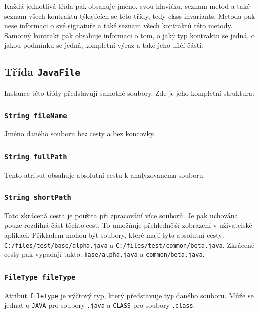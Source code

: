 			Každá jednotlivá třída pak obsahuje jméno, svou hlavičku, seznam metod a také seznam všech kontraktů týkajících se této třídy, tedy class invariants. Metoda pak nese informaci o své signatuře a také seznam všech kontraktů této metody. Samotný kontrakt pak obsahuje informaci o tom, o jaký typ kontraktu se jedná, o jakou podmínku se jedná, kompletní výraz a také jeho dílčí části.
			
			
			\subsection{Třída \texttt{JavaFile}}
				Instance této třídy představují samotné soubory. Zde je jeho kompletní struktura:
				
				\subsubsection{\texttt{String fileName}}	
					Jméno daného souboru bez cesty a bez koncovky.
					
				\subsubsection{\texttt{String fullPath}}
					Tento atribut obsahuje absolutní cestu k analyzovanému souboru.
					
				\subsubsection{\texttt{String shortPath}}
					Tato zkrácená cesta je použita při zpracování více souborů. Je pak uchována pouze rozdílná část těchto cest. To umožňuje přehlednější zobrazení v uživatelské aplikaci. Příkladem mohou být soubory, které mají tyto absolutní cesty: \texttt{C:/files/test/base/alpha.java} a \texttt{C:/files/test/common/beta.java}. Zkrácené cesty pak vypadají takto: \texttt{base/alpha.java} a \texttt{common/beta.java}.
					
				\subsubsection{\texttt{FileType fileType}}
					Atribut \texttt{fileType} je výčtový typ, který představuje typ daného souboru. Může se jednat o \texttt{JAVA} pro soubory \texttt{.java} a \texttt{CLASS} pro soubory \texttt{.class}.
					
